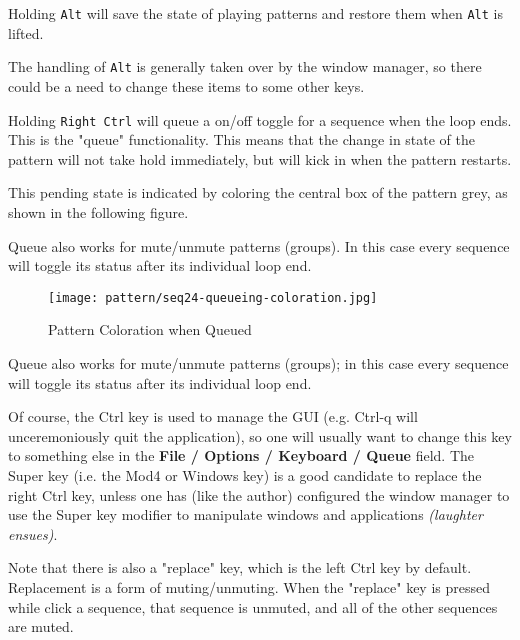    Holding \texttt{Alt} will save the state of playing patterns and restore
   them when \texttt{Alt} is lifted.

   The handling of \texttt{Alt} is generally taken over by the window
   manager, so there could be a need to change these items to some other
   keys.


	Holding \texttt{Right Ctrl} will queue a on/off toggle for a 
	sequence when the loop ends. This is the "queue" functionality.
   This means that the change in state of the pattern will not take hold
   immediately, but will kick in when the pattern restarts.

   This pending state is indicated by coloring the central box of the
   pattern grey, as shown in the following figure.

   Queue also works for mute/unmute patterns (groups). In this case every
   sequence will toggle its status after its individual loop end.

\begin{figure}[H]
   \centering 
   \texttt{[image: pattern/seq24-queueing-coloration.jpg]}
   \caption{Pattern Coloration when Queued}
   \label{fig:seq24_queueing_coloration}
\end{figure}

   Queue also works for mute/unmute 
	patterns (groups); in this case every sequence will toggle 
	its status after its individual loop end. 

   Of course, the Ctrl key is used to manage the GUI (e.g. Ctrl-q will
   unceremoniously quit the application), so one will usually want to change
   this key to something else in the
   \textbf{File / Options / Keyboard / Queue} field.
   The Super key (i.e. the Mod4 or Windows key) is a good candidate to
   replace the right Ctrl key, unless one has (like the author) configured
   the window manager to use the Super key modifier to manipulate windows
   and applications \textsl{(laughter ensues)}.

   Note that there is also a "replace" key, which is the left Ctrl key by
   default.  Replacement is a form of muting/unmuting.  When the "replace"
   key is pressed while click a sequence, that sequence is unmuted, and all
   of the other sequences are muted.

